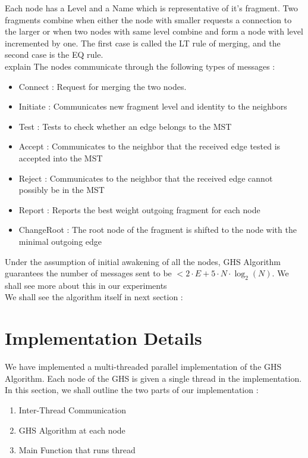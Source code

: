 \documentclass[letterpaper,11pt]{article}
\begin{document}
 	Each node has a {\sc Level} and a {\sc Name} which is representative of it's fragment. Two fragments combine when either the node with smaller requests a connection to the larger or when two nodes with same level combine and form a node with level incremented by one. The first case is called the LT rule of merging, and the second case is the EQ rule. \\
 	explain
 	The nodes communicate through the following types of messages : 
 	\begin{itemize}
 		\item {\sc Connect} : Request for merging the two nodes.
 		\item {\sc Initiate} : Communicates new fragment level and identity to the neighbors
 		\item {\sc Test} : Tests to check whether an edge belongs to the MST
 		\item {\sc Accept} : Communicates to the neighbor that the received edge tested is accepted into the MST
 		\item {\sc Reject} : Communicates to the neighbor that the received edge cannot possibly be in the MST
 		\item {\sc Report} : Reports the best weight outgoing fragment for each node 
 		\item {\sc ChangeRoot} : The root node of the fragment is shifted to the node with the minimal outgoing edge
 	\end{itemize}
 
 	Under the assumption of initial awakening of all the nodes, GHS Algorithm guarantees the number of messages sent to be $< 2\cdot E + 5 \cdot N \cdot \log_2(N)$. We shall see more about this in our experiments \\
	
	We shall see the algorithm itself in next section :
	
	\section{Implementation Details}
	
	We have implemented a multi-threaded parallel implementation of the GHS Algorithm. Each node of the GHS is given a single thread in the implementation. \\ 
	
	In this section, we shall outline the two parts of our implementation : 
	\begin{enumerate}
		\item Inter-Thread Communication 
		\item GHS Algorithm at each node
		\item Main Function that runs thread
	\end{enumerate}
	
\end{document}
